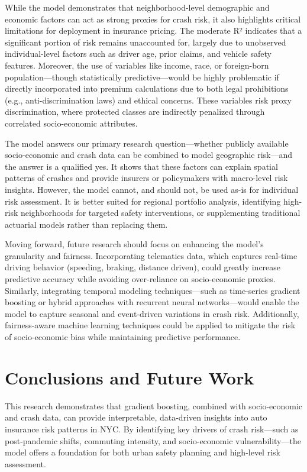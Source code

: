 \documentclass[
  number,
  review,
  3p]{elsarticle}
\begin{document}
While the model demonstrates that neighborhood-level demographic and
economic factors can act as strong proxies for crash risk, it also
highlights critical limitations for deployment in insurance pricing. The
moderate R² indicates that a significant portion of risk remains
unaccounted for, largely due to unobserved individual-level factors such
as driver age, prior claims, and vehicle safety features. Moreover, the
use of variables like income, race, or foreign-born population---though
statistically predictive---would be highly problematic if directly
incorporated into premium calculations due to both legal prohibitions
(e.g., anti-discrimination laws) and ethical concerns. These variables
risk proxy discrimination, where protected classes are indirectly
penalized through correlated socio-economic attributes.

The model answers our primary research question---whether publicly
available socio-economic and crash data can be combined to model
geographic risk---and the answer is a qualified yes. It shows that these
factors can explain spatial patterns of crashes and provide insurers or
policymakers with macro-level risk insights. However, the model cannot,
and should not, be used as-is for individual risk assessment. It is
better suited for regional portfolio analysis, identifying high-risk
neighborhoods for targeted safety interventions, or supplementing
traditional actuarial models rather than replacing them.

Moving forward, future research should focus on enhancing the model's
granularity and fairness. Incorporating telematics data, which captures
real-time driving behavior (speeding, braking, distance driven), could
greatly increase predictive accuracy while avoiding over-reliance on
socio-economic proxies. Similarly, integrating temporal modeling
techniques---such as time-series gradient boosting or hybrid approaches
with recurrent neural networks---would enable the model to capture
seasonal and event-driven variations in crash risk. Additionally,
fairness-aware machine learning techniques could be applied to mitigate
the risk of socio-economic bias while maintaining predictive
performance.

\section{Conclusions and Future Work}\label{conclusions-and-future-work}

This research demonstrates that gradient boosting, combined with
socio-economic and crash data, can provide interpretable, data-driven
insights into auto insurance risk patterns in NYC. By identifying key
drivers of crash risk---such as post-pandemic shifts, commuting
intensity, and socio-economic vulnerability---the model offers a
foundation for both urban safety planning and high-level risk
assessment.
\end{document}
